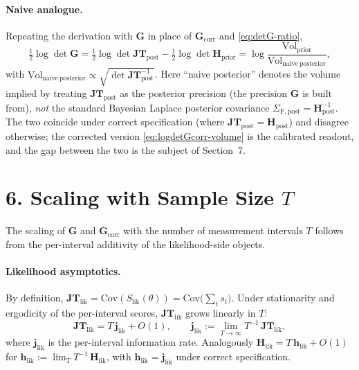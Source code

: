 \documentclass[11pt]{article}
\begin{document}
\paragraph{Naive analogue.}
Repeating the derivation with $\mathbf G$ in place of $\mathbf G_{\mathrm{corr}}$ and \eqref{eq:detG-ratio},
\begin{equation}
\tfrac{1}{2} \log \det \mathbf G
=
\tfrac{1}{2} \log \det \mathbf{JT}_{\mathrm{post}}
- \tfrac{1}{2} \log \det \mathbf H_{\mathrm{prior}}
=
\log \frac{\mathrm{Vol}_{\mathrm{prior}}}{\mathrm{Vol}_{\mathrm{naive\ posterior}}},
\label{eq:logdetG-volume}
\end{equation}
with $\mathrm{Vol}_{\mathrm{naive\ posterior}} \propto \sqrt{\det \mathbf{JT}_{\mathrm{post}}^{-1}}$. Here ``naive posterior'' denotes the volume implied by treating $\mathbf{JT}_{\mathrm{post}}$ as the posterior precision (the precision $\mathbf G$ is built from), \emph{not} the standard Bayesian Laplace posterior covariance $\Sigma_{\mathrm{F},\mathrm{post}} = \mathbf H_{\mathrm{post}}^{-1}$. The two coincide under correct specification (where $\mathbf{JT}_{\mathrm{post}} = \mathbf H_{\mathrm{post}}$) and disagree otherwise; the corrected version \eqref{eq:logdetGcorr-volume} is the calibrated readout, and the gap between the two is the subject of Section~7.

\section*{6. Scaling with Sample Size $T$}

The scaling of $\mathbf G$ and $\mathbf G_{\mathrm{corr}}$ with the number of measurement intervals $T$ follows from the per-interval additivity of the likelihood-side objects.

\paragraph{Likelihood asymptotics.}
By definition, $\mathbf{JT}_{\mathrm{lik}} = \mathrm{Cov}(S_{\mathrm{lik}}(\theta)) = \mathrm{Cov}\bigl(\sum_t s_t\bigr)$. Under stationarity and ergodicity of the per-interval scores, $\mathbf{JT}_{\mathrm{lik}}$ grows linearly in $T$:
\begin{equation}
\mathbf{JT}_{\mathrm{lik}} = T\,\mathbf j_{\mathrm{lik}} + O(1),
\qquad
\mathbf j_{\mathrm{lik}} := \lim_{T\to\infty} T^{-1}\, \mathbf{JT}_{\mathrm{lik}},
\label{eq:JT-scaling}
\end{equation}
where $\mathbf j_{\mathrm{lik}}$ is the per-interval information rate. Analogously $\mathbf H_{\mathrm{lik}} = T\, \mathbf h_{\mathrm{lik}} + O(1)$ for $\mathbf h_{\mathrm{lik}} := \lim_T T^{-1}\, \mathbf H_{\mathrm{lik}}$, with $\mathbf h_{\mathrm{lik}} = \mathbf j_{\mathrm{lik}}$ under correct specification.
\end{document}

